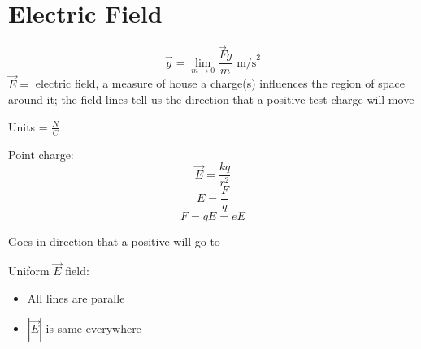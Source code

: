 \documentclass[fleqn]{article}
\begin{document}
\setlength{\mathindent}{0pt}
\section*{Electric Field}
\[ \vec{g} = \lim _{m \to 0} \frac{\vec{F}g}{m} \text{ m/s}^2  \]
$\vec{E}=$ electric field, a measure of house a charge(s) influences the region of space around it; the field lines tell us the direction that a positive test charge will move

Units = $ \frac{N}{C} $

Point charge:\[ \vec{E} = \frac{kq}{r^2} \]
\[ E = \frac{F}{q} \]
\[ F = qE = eE \]

Goes in direction that a positive will go to

\medbreak
Uniform $\vec{E}$ field:
\begin{itemize}
    \item All lines are paralle
    \item $|\vec{E}|$ is same everywhere
\end{itemize}
\end{document}
